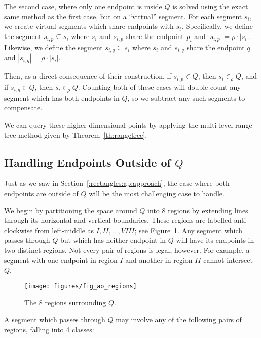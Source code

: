The second case, where only one endpoint is inside $Q$ is solved using the exact same method as the first case, but on a ``virtual'' segment.  For each segment $s_i$, we create virtual segments which share endpoints with $s_i$.  Specifically, we define the segment $s_{i,p} \subseteq s_i$ where $s_i$ and $s_{i,p}$ share the endpoint $p_i$ and $|s_{i,p}| = \rho \cdot |s_i|$. Likewise, we define the segment $s_{i,q} \subseteq s_i$ where $s_i$ and $s_{i,q}$ share the endpoint $q$ and $|s_{i,q}| = \rho \cdot |s_i|$.

Then, as a direct consequence of their construction, if $s_{i,p} \in Q$, then $s_i \in_\rho Q$, and if $s_{i,q} \in Q$, then $s_i \in_\rho Q$.  Counting both of these cases will double-count any segment which has both endpoints in $Q$, so we subtract any such segments to compensate.

We can query these higher dimensional points by applying the multi-level range tree method given by Theorem~\ref{th:rangetree}.


\subsection{Handling Endpoints Outside of $Q$}
\label{:rectangles:ao:bothout}

Just as we saw in Section~\ref{:rectangles:ap:approach}, the case where both endpoints are outside of $Q$ will be the most challenging case to handle.

We begin by partitioning the space around $Q$ into 8 regions by extending lines through its horizontal and vertical boundaries. 
These regions are labelled anti-clockwise from left-middle as $I, II, \ldots, VIII$; see Figure~\ref{fig:rectangles:ao:regions}. 
Any segment which passes through $Q$ but which has neither endpoint in $Q$ will have its endpoints in two distinct regions. 
Not every pair of regions is legal, however.
For example, a segment with one endpoint in region $I$ and another in region $II$ cannot intersect $Q$.

\begin{figure}[t]
\begin{center}
  \texttt{[image: figures/fig\_ao\_regions]}
  \caption{The 8 regions surrounding $Q$.}
  \label{fig:rectangles:ao:regions}
\end{center}
\end{figure}

A segment which passes through $Q$ may involve any of the following pairs of regions, falling into 4 classes:

